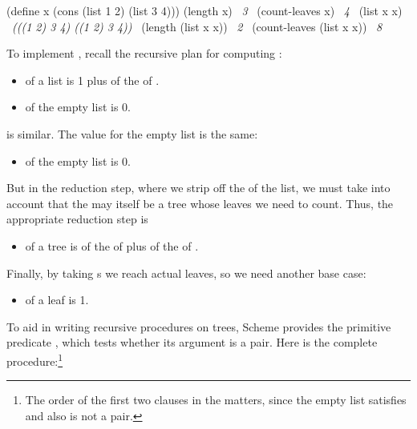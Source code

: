 \begin{codeBlock}
(define x (cons (list 1 2) (list 3 4)))
(length x)
~\textit{3}~
(count-leaves x)
~\textit{4}~
(list x x)
~\textit{(((1 2) 3 4) ((1 2) 3 4))}~
(length (list x x))
~\textit{2}~
(count-leaves (list x x))
~\textit{8}~
\end{codeBlock}

\noindent
To implement , recall the recursive plan for computing
:

\begin{itemize}
\item
{} of a list  is 1 plus  of the
 of .

\item
{} of the empty list is 0.
\end{itemize}

\noindent
{} is similar.  The value for the empty list is the same:

\begin{itemize}
\item
{} of the empty list is 0.
\end{itemize}

\noindent
But in the reduction step, where we strip off the  of the list, we
must take into account that the  may itself be a tree whose leaves we
need to count.  Thus, the appropriate reduction step is

\begin{itemize}
\item
{} of a tree  is  of the 
of  plus  of the  of .
\end{itemize}

\noindent
Finally, by taking s we reach actual leaves, so we need another base
case:

\begin{itemize}
\item
{} of a leaf is 1.
\end{itemize}

\noindent
To aid in writing recursive procedures on trees, Scheme provides the primitive
predicate , which tests whether its argument is a pair.  Here is
the complete procedure:\footnote{The order of the first two clauses in the
 matters, since the empty list satisfies  and also is
not a pair.}

